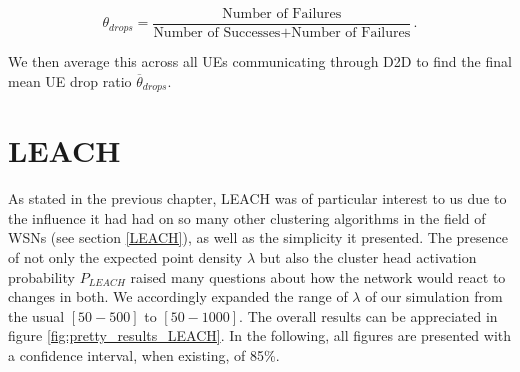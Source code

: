 \begin{equation}\label{eq:UEDR}
\theta_{drops} = \frac {\text{Number of Failures}} {\text{Number of Successes} + \text{Number of Failures}} \,\text{.}
\end{equation}

We then average this across all UEs communicating through D2D to find the final mean UE drop ratio $\overline{\theta}_{drops}$.

\section{LEACH}\label{description:LEACH}
As stated in the previous chapter, LEACH was of particular interest to us due to the influence it had had on so many other clustering algorithms in the field of WSNs (see section \ref{LEACH}), as well as the simplicity it presented. The presence of not only the expected point density $\lambda$ but also the cluster head activation probability $P_{LEACH}$ raised many questions about how the network would react to changes in both. We accordingly expanded the range of $\lambda$ of our simulation from the usual $[50 - 500]$ to $[50 - 1000]$. The overall results can be appreciated in figure \ref{fig:pretty_results_LEACH}. In the following, all figures are presented with a confidence interval, when existing, of 85\%.

